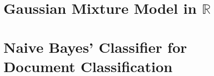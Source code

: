 \documentclass[a4 paper]{article}
\newcommand{\rr}{\mathbb{R}}
\begin{document}
\section{Gaussian Mixture Model in $\rr$}
\label{sec:gmm}

\label{prob:3}



\section{Naive Bayes' Classifier for Document Classification}
\label{sec:docClassification}


\end{document}
